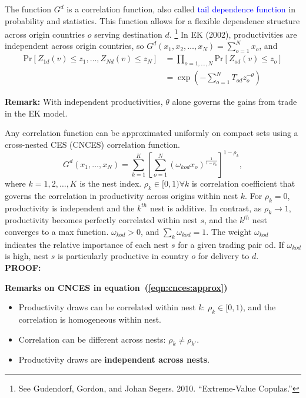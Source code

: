 The function $G^d$ is a correlation function, 
also called \textcolor{blue}{tail dependence function} 
in probability and statistics. 
This function allows for a flexible dependence structure across origin countries $o$ 
serving destination $d$.%
\footnote{
    See Gudendorf, Gordon, and Johan Segers. 2010. “Extreme-Value Copulas.”
}
In EK (2002), productivities are independent across origin countries, so 
$G^d(x_1, x_2, \ldots, x_N) = \sum_{o=1}^N x_o$,
and
\begin{equation}
    \begin{aligned}
        \text{Pr}\left[Z_{1 d}(v) \leq z_1, \ldots, Z_{N d}(v) \leq z_N\right] & 
        = \prod_{o=1,\ldots,N}  \text{Pr}\left[Z_{o d}(v) \leq z_o \right] \\
        & = \exp \left( - \sum_{o=1}^N T_{od} z_o^{-\theta} \right)
    \end{aligned}
\end{equation}

\textbf{Remark:} With independent productivities, 
$\theta$ alone governs the gains from trade in the EK model.



\begin{boxedproposition}
    Any correlation function can be approximated uniformly on compact sets using a cross-nested CES (CNCES) correlation function.
    \begin{equation}
        \label{eqn:cnces:approx}
        G^d\left(x_1, \ldots, x_N\right)=\sum_{k=1}^K\left[\sum_{o=1}^N\left(\omega_{k o d} x_o\right)^{\frac{1}{1-\rho_k}}\right]^{1-\rho_k},
    \end{equation}
where $k = 1,2,\ldots,K$ is the nest index. 
$\rho_k \in[0,1) \forall k$ is correlation coefficient that governs the correlation in productivity across origins within nest $k$. 
For $\rho_k=0$, productivity is independent and the $k^{th}$ nest is additive. 
In contrast, as $\rho_k \rightarrow 1$,
productivity becomes perfectly correlated within nest $s$, and the $k^{th}$ nest converges to a max function.
$\omega_{k o d}>0$, and $\sum_k \omega_{k o d}=1$. 
The weight $\omega_{k o d}$ indicates the relative importance of each nest $s$ for a given trading pair od. 
If $\omega_{k o d}$ is high, nest $s$ is particularly productive in country $o$ for delivery to $d$.
\\
\noindent \textbf{PROOF:}
\end{boxedproposition}

\textbf{Remarks on CNCES in equation~(\ref{eqn:cnces:approx})}
\begin{itemize}
    \item Productivity draws can be correlated within nest $k$: $\rho_k \in[0,1)$, and the correlation is homogeneous within nest.
    \item Correlation can be different across nests: $\rho_k \neq \rho_{k'}$.
    \item Productivity draws are \textbf{independent across nests}.
\end{itemize}

